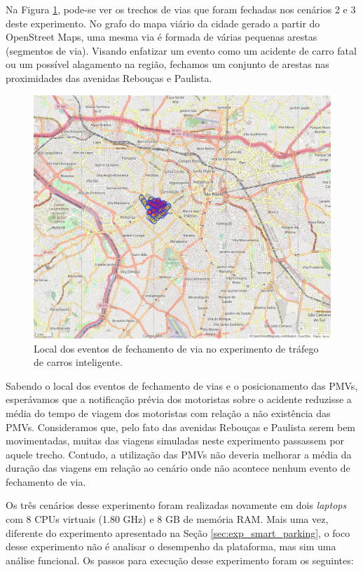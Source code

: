 Na Figura \ref{fig:eventos}, pode-se ver os trechos de vias que foram fechadas nos cenários 2 e 3 deste experimento.
No grafo do mapa viário da cidade gerado a partir do OpenStreet Maps, uma mesma via é formada de várias pequenas arestas (segmentos de via).
Visando enfatizar um evento como um acidente de carro fatal ou um possível alagamento na região, fechamos um conjunto de arestas nas proximidades das avenidas Rebouças e Paulista.

\begin{figure}[ht]
	\centering
	\includegraphics[width=.7\textwidth]{figuras/events_edges_map.png}
	\caption{Local dos eventos de fechamento de via no experimento de tráfego de carros inteligente.}
	\label{fig:eventos}
\end{figure}

Sabendo o local dos eventos de fechamento de vias e o posicionamento das PMVs, esperávamos que a notificação prévia dos motoristas sobre o acidente reduzisse a média do tempo de viagem dos motoristas
com relação a não existência das PMVs.
Consideramos que, pelo fato das avenidas Rebouças e Paulista serem bem movimentadas, muitas das viagens simuladas neste experimento passassem por aquele trecho. 
Contudo, a utilização das PMVs não deveria melhorar a média da duração das viagens em relação ao cenário onde não acontece nenhum evento de fechamento de via.

Os três cenários desse experimento foram realizadas novamente em dois \textit{laptops} com 8 CPUs virtuais (1.80 GHz) e 8 GB de memória RAM.
Mais uma vez, diferente do experimento apresentado na Seção \ref{sec:exp_smart_parking}, o foco desse experimento não é analisar o desempenho da plataforma, mas sim uma análise funcional. 
Os passos para execução desse experimento foram os seguintes:

